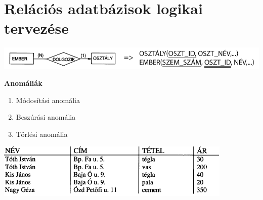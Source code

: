 \section{Relációs adatbázisok logikai tervezése}

	\begin{center}
		\includegraphics[scale=0.6]{img/ERtoREL}
	\end{center}

	\textbf{Anomáliák}
		\begin{enumerate}
			\item Módosítási anomália

				\forceindent

			\item Beszúrási anomália

			\item Törlési anomália
		\end{enumerate}

	\begin{center}
		\includegraphics[scale=0.9]{img/Anomalia}
	\end{center}
